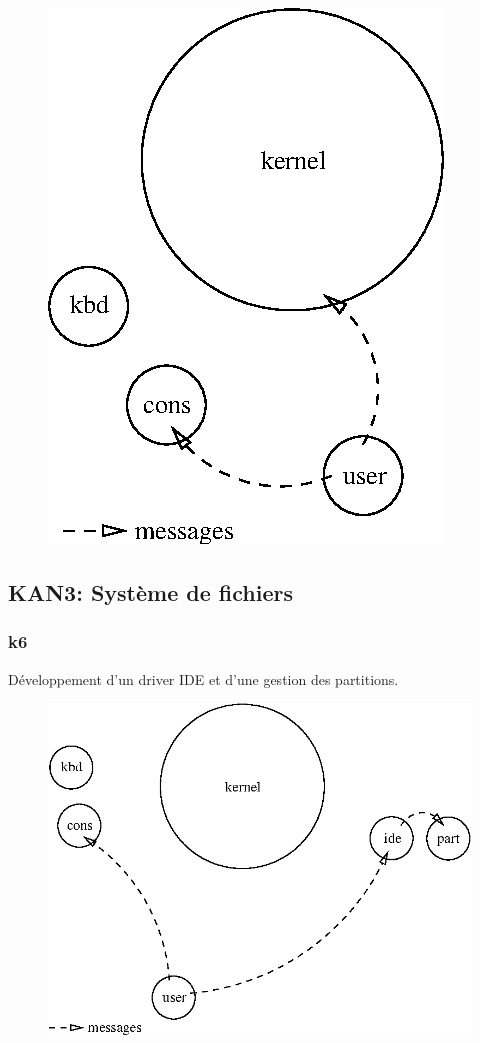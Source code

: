 \documentclass[10pt,a4wide]{article}
\begin{document}
\begin{figure}[h]
\centerline{\includegraphics{figures/k5.eps}}
\end{figure}

\newpage

\subsection{KAN3: Syst\`eme de fichiers}

\subsubsection{k6}

D\'eveloppement d'un driver IDE et d'une gestion des partitions.

\vspace{5cm}

\begin{figure}[h]
\centerline{\includegraphics{figures/k6.eps}}
\end{figure}
\end{document}
